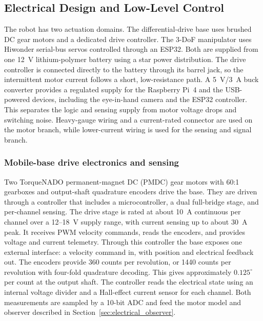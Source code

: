 
\subsection{Electrical Design and Low-Level Control}
\label{sec:electrical_design}

The robot has two actuation domains. The differential-drive base uses brushed DC gear motors and a dedicated drive controller. The 3-DoF manipulator uses Hiwonder serial-bus servos controlled through an ESP32. Both are supplied from one 12~V lithium-polymer battery using a star power distribution. The drive controller is connected directly to the battery through its barrel jack, so the intermittent motor current follows a short, low-resistance path. A 5~V/3~A buck converter provides a regulated supply for the Raspberry Pi~4 and the USB-powered devices, including the eye-in-hand camera and the ESP32 controller. This separates the logic and sensing supply from motor voltage drops and switching noise. Heavy-gauge wiring and a current-rated connector are used on the motor branch, while lower-current wiring is used for the sensing and signal branch.

\subsubsection{Mobile-base drive electronics and sensing}
\label{sec:electrical_drive}

Two TorqueNADO permanent-magnet DC (PMDC) gear motors with 60:1 gearboxes and output-shaft quadrature encoders drive the base. They are driven through a controller that includes a microcontroller, a dual full-bridge stage, and per-channel sensing. The drive stage is rated at about 10~A continuous per channel over a 12--18~V supply range, with current sensing up to about 30~A peak. It receives PWM velocity commands, reads the encoders, and provides voltage and current telemetry. Through this controller the base exposes one external interface: a velocity command in, with position and electrical feedback out. The encoders provide 360 counts per revolution, or 1440 counts per revolution with four-fold quadrature decoding. This gives approximately $0.125^\circ$ per count at the output shaft. The controller reads the electrical state using an internal voltage divider and a Hall-effect current sensor for each channel. Both measurements are sampled by a 10-bit ADC and feed the motor model and observer described in Section~\ref{sec:electrical_observer}.

